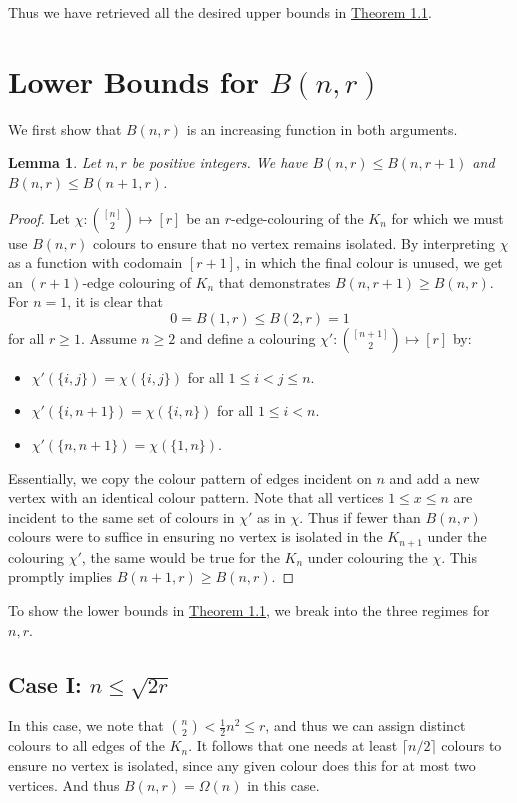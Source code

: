 \documentclass[11pt,a4paper]{article}
\newtheorem{lemma}[theorem]{Lemma}
\begin{document}
\noindent
Thus we have retrieved all the desired upper bounds in \hyperref[thm:1:1]{Theorem 1.1}.
\section{Lower Bounds for \texorpdfstring{$B(n, r)$}{B(n, r)}}
We first show that $B(n, r)$ is an increasing function in both arguments.
\begin{lemma}
\label{lem:3:1} 
Let $n, r$ be positive integers. We have $B(n, r) \le B(n, r+1)$ and $B(n, r) \leq B(n+1, r)$.
\end{lemma}
\begin{proof}
Let $\chi : \binom{[n]}{2} \mapsto [r]$ be an $r$-edge-colouring of the $K_n$ for which we must use $B(n,r)$ colours to ensure that no vertex remains isolated. By interpreting $\chi$ as a function with codomain $[r+1]$, in which the final colour is unused, we get an $(r+1)$-edge colouring of $K_n$ that demonstrates $B(n,r+1) \geq B(n,r)$. \\

\noindent
For $n = 1$, it is clear that \[0 = B(1, r) \leq B(2, r) = 1\] for all $r \geq 1$. Assume $n \geq 2$ and define a colouring $\chi' : \binom{[n+1]}{2} \mapsto [r]$ by: \begin{itemize}
    \item $\chi'(\{i, j\}) = \chi(\{i, j\})$ for all $1 \leq i < j \leq n$.
    \item $\chi'(\{i, n+1\}) = \chi(\{i, n\})$ for all $1 \leq i < n$.
    \item $\chi'(\{n, n+1\}) = \chi(\{1, n\})$.
\end{itemize}
Essentially, we copy the colour pattern of edges incident on $n$ and add a new vertex with an identical colour pattern. Note that all vertices $1 \leq x \leq n$ are incident to the same set of colours in $\chi'$ as in $\chi$. Thus if fewer than $B(n,r)$ colours were to suffice in ensuring no vertex is isolated in the $K_{n+1}$ under the colouring $\chi'$, the same would be true for the $K_n$ under colouring the $\chi$. This promptly implies $B(n+1, r) \geq B(n, r)$.
\end{proof}
To show the lower bounds in \hyperref[thm:1:1]{Theorem 1.1}, we break into the three regimes for $n, r$.
\subsection*{Case I: $n \leq \sqrt{2r}$}
\noindent
In this case, we note that $\binom{n}{2} < \frac{1}{2}n^2 \leq r$, and thus we can assign distinct colours to all edges of the $K_n$. It follows that one needs at least $\lceil n/2 \rceil$  colours to ensure no vertex is isolated, since any given colour does this for at most two vertices. And thus $B(n, r) = \Omega(n)$ in this case. 
\end{document}
